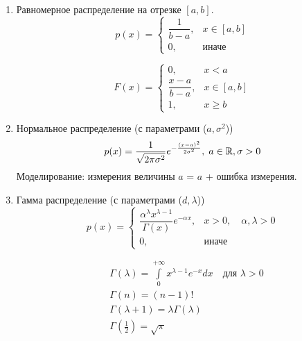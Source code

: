 \begin{example}~

	\begin{enumerate}
		\item 
			Равномерное распределение на отрезке $[a, b]$.
			\begin{equation*}
				p(x) =
				\begin{cases}
					\dfrac{1}{b - a},&x \in [a, b]\\
					0				,&\text{иначе}
				\end{cases}		
			\end{equation*}
			
			\begin{equation*}
				F(x) =
				\begin{cases}
					0, &x < a\\
					\dfrac{x - a}{b - a}, &x \in [a, b]\\
					1, &x \geq b
				\end{cases}
			\end{equation*}
		
		\item 
			Нормальное распределение (с параметрами ($a, \sigma^2$))
			\begin{equation*}
				p(x) = \frac{1}{\sqrt{2\pi \sigma^2}} e^{-\frac{(x - a)^2}{2 \sigma^2}},\;
				a \in \mathbb{R}, \sigma > 0
			\end{equation*}
			Моделирование: измерения величины $a$ = $a$ + ошибка измерения.
		
		\item 
			Гамма распределение (с параметрами ($d, \lambda$))
			\begin{equation*}			
				p(x) = 			
				\begin{cases}
					\dfrac{\alpha^\lambda x^{\lambda - 1}}{\Gamma(x)} e^{-\alpha x}, 
					&x > 0, \quad \alpha, \lambda > 0\\
					0, &\text{иначе}
				\end{cases}
			\end{equation*}
			\begin{definition}
				\begin{align*}				
					&\Gamma(\lambda) = \int\limits_{0}^{+\infty} x^{\lambda - 1} e^{-x} dx 
						\quad \text{для $\lambda > 0$} \\
					&\Gamma(n) = (n - 1)!\\
					&\Gamma(\lambda + 1) = \lambda \Gamma(\lambda)\\
					&\Gamma \left( \frac{1}{2} \right) = \sqrt{\pi}
				\end{align*}
			\end{definition}
			

\end{enumerate}
\end{example}
